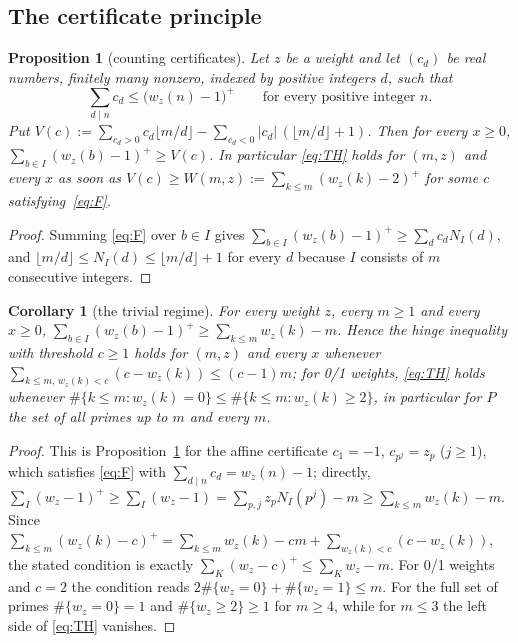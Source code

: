 \documentclass[11pt]{article}
\newtheorem{proposition}[theorem]{Proposition}
\newtheorem{corollary}[theorem]{Corollary}
\theoremstyle{definition}
\begin{document}
\subsection*{The certificate principle}

\begin{proposition}[counting certificates]\label{prop:cert}
Let $z$ be a weight and let $(c_d)$ be real numbers, finitely many nonzero, indexed by positive integers $d$, such that
\begin{equation}\label{eq:F}
\sum_{d\mid n}c_d\le\bigl(w_z(n)-1\bigr)^+\qquad\text{for every positive integer $n$.}
\end{equation}
Put $V(c):=\sum_{c_d>0}c_d\lfloor m/d\rfloor-\sum_{c_d<0}|c_d|\,(\lfloor m/d\rfloor+1)$. Then for every $x\ge0$,
$\sum_{b\in I}(w_z(b)-1)^+\ge V(c)$. In particular \eqref{eq:TH} holds for $(m,z)$ and every $x$ as soon as
$V(c)\ge W(m,z):=\sum_{k\le m}(w_z(k)-2)^+$ for some $c$ satisfying~\eqref{eq:F}.
\end{proposition}
\begin{proof}
Summing \eqref{eq:F} over $b\in I$ gives $\sum_{b\in I}(w_z(b)-1)^+\ge\sum_d c_dN_I(d)$, and
$\lfloor m/d\rfloor\le N_I(d)\le\lfloor m/d\rfloor+1$ for every $d$ because $I$ consists of $m$ consecutive integers.
\end{proof}

\begin{corollary}[the trivial regime]\label{cor:affine}
For every weight $z$, every $m\ge1$ and every $x\ge0$, $\sum_{b\in I}(w_z(b)-1)^+\ge\sum_{k\le m}w_z(k)-m$. Hence the hinge inequality
with threshold $c\ge1$ holds for $(m,z)$ and every $x$ whenever $\sum_{k\le m,\,w_z(k)<c}(c-w_z(k))\le(c-1)m$; for 0/1 weights,
\eqref{eq:TH} holds whenever $\#\{k\le m:w_z(k)=0\}\le\#\{k\le m:w_z(k)\ge2\}$, in particular for $P$ the set of all primes up to $m$ and every $m$.
\end{corollary}
\begin{proof}
This is Proposition~\ref{prop:cert} for the affine certificate $c_1=-1$, $c_{p^j}=z_p$ ($j\ge1$), which satisfies \eqref{eq:F} with
$\sum_{d\mid n}c_d=w_z(n)-1$; directly, $\sum_I(w_z-1)^+\ge\sum_I(w_z-1)=\sum_{p,j}z_pN_I(p^j)-m\ge\sum_{k\le m}w_z(k)-m$. Since
$\sum_{k\le m}(w_z(k)-c)^+=\sum_{k\le m}w_z(k)-cm+\sum_{w_z(k)<c}(c-w_z(k))$, the stated condition is exactly $\sum_K(w_z-c)^+\le\sum_Kw_z-m$.
For 0/1 weights and $c=2$ the condition reads $2\#\{w_z=0\}+\#\{w_z=1\}\le m$. For the full set of primes $\#\{w_z=0\}=1$ and
$\#\{w_z\ge2\}\ge1$ for $m\ge4$, while for $m\le3$ the left side of \eqref{eq:TH} vanishes.
\end{proof}
\end{document}

